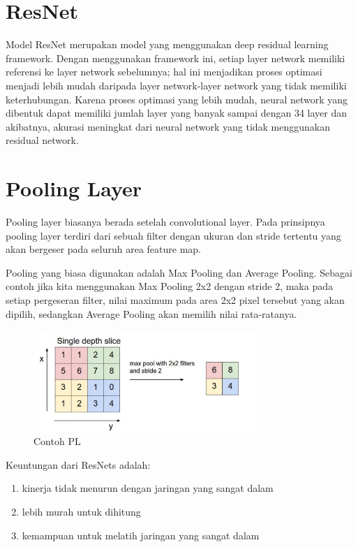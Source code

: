 \section{ResNet}
Model ResNet merupakan model yang menggunakan deep residual learning framework. Dengan menggunakan framework ini, setiap layer network memiliki referensi ke layer network sebelumnya; hal ini menjadikan proses optimasi menjadi lebih mudah daripada layer network-layer network yang tidak memiliki keterhubungan. Karena proses optimasi yang lebih mudah, neural network yang dibentuk
dapat memiliki jumlah layer yang banyak sampai dengan 34 layer dan akibatnya, akurasi meningkat dari neural network yang tidak menggunakan residual network.


\section{Pooling Layer}
Pooling layer biasanya berada setelah convolutional layer. Pada prinsipnya pooling layer terdiri dari sebuah filter dengan ukuran dan stride tertentu yang akan bergeser pada seluruh area feature map.

Pooling yang biasa digunakan adalah Max Pooling dan Average Pooling. Sebagai contoh jika kita menggunakan Max Pooling 2x2 dengan stride 2, maka pada setiap pergeseran filter, nilai maximum pada area 2x2 pixel tersebut yang akan dipilih, sedangkan Average Pooling akan memilih nilai rata-ratanya.

\begin{figure}[!htp]
	\includegraphics[width=0.75\textwidth]{figures/PoolingLayer.PNG}
	\caption{Contoh PL}
	\label{labelgambar6}
\end{figure}


Keuntungan dari ResNets adalah:

\begin{enumerate}
\item kinerja tidak menurun dengan jaringan yang sangat dalam
\item lebih murah untuk dihitung
\item kemampuan untuk melatih jaringan yang sangat dalam
\end{enumerate}

